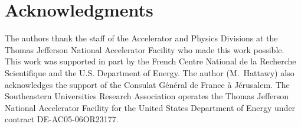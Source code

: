 \section{Acknowledgments}

The authors thank the staff of the Accelerator and Physics Divisions at the 
Thomas Jefferson National Accelerator Facility who made this work 
possible. This work was supported in part by the French Centre National de la 
Recherche Scientifique and the U.S. Department of Energy. The 
author (M.~Hattawy) also acknowledges the support of the Consulat G\'en\'eral de France \`a J\'erusalem. 
The Southeastern Universities Research Association operates the Thomas 
Jefferson National Accelerator Facility for the United States Department of 
Energy under contract DE-AC05-06OR23177.
